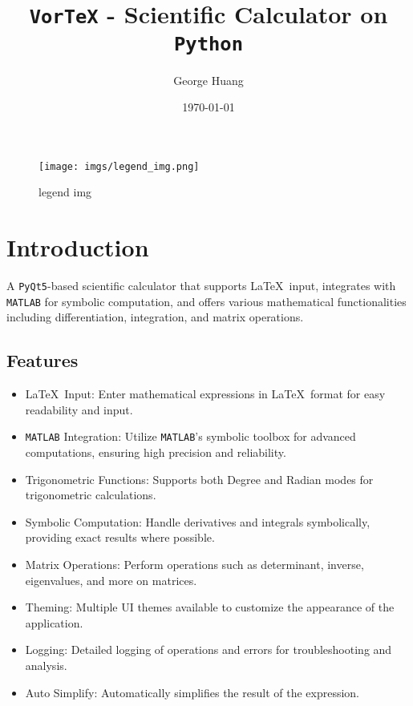 \documentclass{article}
\begin{document}
\title{\texttt{VorTeX} - Scientific Calculator on \texttt{Python}}
\author{George Huang}
\date{\today}
\maketitle

\begin{center}

\end{center}

\begin{figure}[h]
\centering
\texttt{[image: imgs/legend\_img.png]}
\caption{legend img}
\end{figure}

\section{Introduction}

\noindent A \texttt{PyQt5}-based scientific calculator that supports \LaTeX \, input,
integrates with \texttt{MATLAB} for symbolic computation, and offers various
mathematical functionalities including differentiation, integration, and
matrix operations.

\subsection{Features}

\begin{itemize}
\item \LaTeX \, Input: Enter mathematical expressions in
  \LaTeX \, format for easy readability and input.
\item \texttt{MATLAB} Integration: Utilize \texttt{MATLAB}'s symbolic toolbox for
  advanced computations, ensuring high precision and reliability.
\item Trigonometric Functions: Supports both Degree and Radian
  modes for trigonometric calculations.
\item Symbolic Computation: Handle derivatives and integrals
  symbolically, providing exact results where possible.
\item Matrix Operations: Perform operations such as determinant,
  inverse, eigenvalues, and more on matrices.
\item Theming: Multiple UI themes available to customize the
  appearance of the application.
\item Logging: Detailed logging of operations and errors for
  troubleshooting and analysis.
\item Auto Simplify: Automatically simplifies the result of the
  expression.
\end{itemize}
\end{document}
